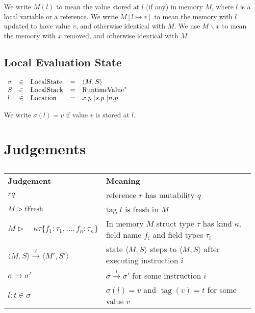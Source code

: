 \documentclass{article}
\newcommand{\tmop}[1]{\ensuremath{\operatorname{#1}}}
\newcommand{\tmstrong}[1]{\textbf{#1}}
\newcommand{\tmxspace}{\hspace{1em}}
\begin{document}
We write $M (l)$ to mean the value stored at $l$ (if any) in memory $M$, where
$l$ is a local variable or a reference. We write $M [l \mapsto v]$ to mean the
memory with $l$ updated to have value $v$, and otherwise identical with $M$.
We use $M\backslash x$ to mean the memory with $x$ removed, and otherwise
identical with $M$.

\subsection{Local Evaluation State}

$\begin{array}{lllll}
  \sigma & \in & \tmop{LocalState} & = & \langle M, S \rangle\\
  S & \in & \tmop{LocalStack} & = & \tmop{RuntimeValue}^{\ast}\\
  l & \in & \tmop{Location} & = & \text{$x.p$ \textbar $s.p$ \textbar $n.p$ }
\end{array}$

We write $\sigma (l) = v$ if value $v$ is stored at $l$.

\section{Judgements}

\begin{table}[h]
  \begin{tabular}{ll}
    {\tmstrong{Judgement}} & {\tmstrong{Meaning}}\\
    $r q$ & reference $r$ has mutability $q$\\
    $M \vartriangleright t \tmstrong{\tmop{Fresh}}$ & tag $t$ is fresh in
    $M$\\
    $M \vartriangleright \tmxspace \kappa \tau \{ f_1 : \tau_1, \ldots, f_n :
    \tau_n \}$ & In memory $M$ struct type $\tau$ has kind $\kappa$, field
    name $f_i$ and field types $\tau_i$\\
    $\langle M, S \rangle \xrightarrow{i} \langle M', S' \rangle$ & state
    $\langle M, S \rangle$ steps to $\langle M, S \rangle$ after executing
    instruction $i$\\
    $\sigma \rightarrow \sigma'$ & $\sigma \xrightarrow{i} \sigma'$ for some
    instruction $i$\\
    $l : t \in \sigma$ & $\sigma (l) = v$ and $\tmop{tag} (v) = t$ for some
    value $v$
  \end{tabular}
  \caption{}
\end{table}
\end{document}
